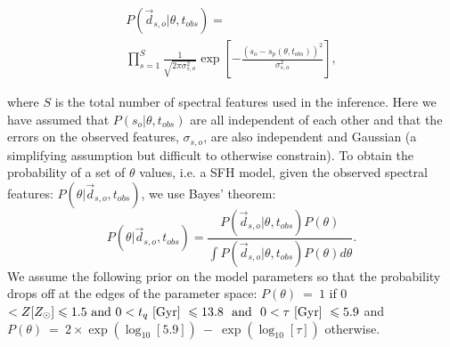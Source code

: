 \documentclass[useAMS,usenatbib]{mn2e}
\begin{document}

\begin{multline}\label{like}
P(\vec{d}_{s, o}|\theta, t_{obs}) = \\ \prod_{s=1}^{S} \frac{1}{\sqrt{2\pi\sigma_{s,o}^2}} \exp{\left[ - \frac{(s_{o} - s_{p}(\theta, t_{obs}))^2}{\sigma_{s, o}^2} \right]},
\end{multline}

where $S$ is the total number of spectral features used in the inference. Here we have assumed that $P(s_{o}|\theta, t_{obs})$ are all independent of each other and that the errors on the observed features, $\sigma_{s, o}$, are also independent and Gaussian (a simplifying assumption but difficult to otherwise constrain). To obtain the probability of a set of $\theta$ values, i.e. a SFH model, given the observed spectral features: $P(\theta|\vec{d}_{s,o}, t_{obs})$, we use Bayes' theorem:
 \begin{equation}\label{eq:bayes}
P(\theta|\vec{d}_{s,o}, t_{obs}) = \frac{P(\vec{d}_{s,o}|\theta, t_{obs})P(\theta)}{\int P(\vec{d}_{s,o} |\theta, t_{obs})P(\theta) d\theta}.
\end{equation}
We assume the following prior on the model parameters so that the probability drops off at the edges of the parameter space: ${P(\theta)~=~1}$ if 0 $< Z [Z_{\odot}] \leq 1.5 \text{ and } 0 < t_q ~\rm{[Gyr]}~ \leq 13.8 ~ \text{ and } ~ 0 < \tau  ~\rm{[Gyr]}~ \leq 5.9$ and ${P(\theta)~=~2\times\exp\left(\log_{10}[5.9]\right)~-~\exp\left(\log_{10}[\tau]\right)}$ otherwise.


\end{document}
